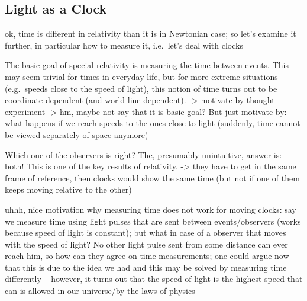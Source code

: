 		\subsection{Light as a Clock}
ok, time is different in relativity than it is in Newtonian case; so let's examine it further, in particular how to measure it, i.e.~let's deal with clocks


The basic goal of special relativity is measuring the time between events. This may seem trivial for times in everyday life, but for more extreme situations (e.g.~speeds close to the speed of light), this notion of time turns out to be coordinate-dependent (and world-line dependent). -> motivate by thought experiment
-> hm, maybe not say that it is basic goal? But just motivate by: what happens if we reach speeds to the ones close to light (suddenly, time cannot be viewed separately of space anymore)


Which one of the observers is right? The, presumably unintuitive, answer is: both! This is one of the key results of relativity. -> they have to get in the same frame of reference, then clocks would show the same time (but not if one of them keeps moving relative to the other)



uhhh, nice motivation why measuring time does not work for moving clocks: say we measure time using light pulses that are sent between events/observers (works because speed of light is constant); but what in case of a observer that moves with the speed of light? No other light pulse sent from some distance can ever reach him, so how can they agree on time measurements; one could argue now that this is due to the idea we had and this may be solved by measuring time differently -- however, it turns out that the speed of light is the highest speed that can is allowed in our universe/by the laws of physics

